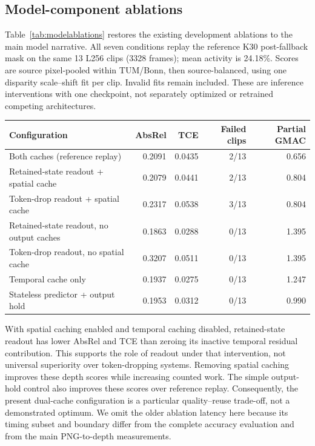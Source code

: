 \documentclass[mathematics,article,submit,moreauthors]{Definitions/mdpi}
\renewcommand{\caption}[2][]{}
\renewcommand{\label}[1]{}
\begin{document}
\subsection{Model-component ablations}
Table~\ref{tab:modelablations} restores the existing development ablations to the
main model narrative. All seven conditions replay the reference K30 post-fallback
mask on the same 13 L256 clips (3328 frames); mean activity is 24.18\%.
Scores are source pixel-pooled within TUM/Bonn, then source-balanced, using one
disparity scale--shift fit per clip. Invalid fits remain included.
These are inference interventions with one checkpoint, not separately optimized
or retrained competing architectures.
\begin{table}[H]
\caption{Development-only model ablations under a shared mask. Lower AbsRel/TCE is better.
GMAC counts executed Linear/Conv2d operations only, excluding selective scan and other
operations; it is not total FLOPs or latency.}\label{tab:modelablations}
\centering\small
\begin{tabular}{lrrrr}\toprule
Configuration & AbsRel & TCE & Failed clips & Partial GMAC\\
\midrule
Both caches (reference replay) & 0.2091 & 0.0435 & 2/13 & 0.656\\
Retained-state readout + spatial cache & 0.2079 & 0.0441 & 2/13 & 0.804\\
Token-drop readout + spatial cache & 0.2317 & 0.0538 & 3/13 & 0.804\\
Retained-state readout, no output caches & 0.1863 & 0.0288 & 0/13 & 1.395\\
Token-drop readout, no spatial cache & 0.3207 & 0.0511 & 0/13 & 1.395\\
Temporal cache only & 0.1937 & 0.0275 & 0/13 & 1.247\\
Stateless predictor + output hold & 0.1953 & 0.0312 & 0/13 & 0.990\\
\bottomrule\end{tabular}
\end{table}
With spatial caching enabled and temporal caching disabled, retained-state readout
has lower AbsRel and TCE than zeroing its inactive temporal residual contribution.
This supports the role of readout under that intervention, not universal superiority
over token-dropping systems. Removing spatial caching improves these depth scores
while increasing counted work. The simple output-hold control also improves these
scores over reference replay. Consequently, the present dual-cache configuration
is a particular quality--reuse trade-off, not a demonstrated optimum. We omit the
older ablation latency here because its timing subset and boundary differ from
the complete accuracy evaluation and from the main PNG-to-depth measurements.
\end{document}
